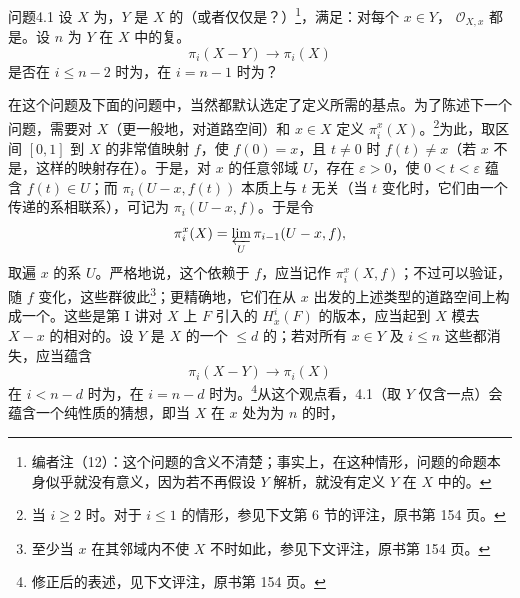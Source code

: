 \begin{SGAresult}{问题}{4.1}
设 $X$ 为，$Y$ 是 $X$ 的（或者仅仅是？）\footnote{编者注（12）：这个问题的含义不清楚；事实上，在这种情形，问题的命题本身似乎就没有意义，因为若不再假设 $Y$ 解析，就没有定义 $Y$ 在 $X$ 中的。}，满足：对每个 $x\in Y$， $\mathcal O_{X,x}$ 都是。设 $n$ 为 $Y$ 在 $X$ 中的复。
\[
\pi_i(X-Y)\longrightarrow\pi_i(X)
\]
是否在 $i\leq n-2$ 时为，在 $i=n-1$ 时为？
\end{SGAresult}
在这个问题及下面的问题中，当然都默认选定了定义所需的基点。为了陈述下一个问题，需要对 $X$（更一般地，对道路空间）和 $x\in X$ 定义 $\pi_i^x(X)$。\footnote{当 $i\geq2$ 时。对于 $i\leq1$ 的情形，参见下文第 6 节的评注，原书第 154 页。}为此，取区间 $[0,1]$ 到 $X$ 的非常值映射 $f$，使 $f(0)=x$，且 $t\ne0$ 时 $f(t)\ne x$（若 $x$ 不是，这样的映射存在）。于是，对 $x$ 的任意邻域 $U$，存在 $\varepsilon>0$，使 $0<t<\varepsilon$ 蕴含 $f(t)\in U$；而 $\pi_i(U-x,f(t))$ 本质上与 $t$ 无关（当 $t$ 变化时，它们由一个传递的系相联系），可记为 $\pi_i(U-x,f)$。于是令
\[
\pi_i^x(X)=\varprojlim_U\pi_{i-1}(U-x,f),
\]
取遍 $x$ 的系 $U$。严格地说，这个依赖于 $f$，应当记作 $\pi_i^x(X,f)$；不过可以验证，随 $f$ 变化，这些群彼此\footnote{至少当 $x$ 在其邻域内不使 $X$ 不时如此，参见下文评注，原书第 154 页。}；更精确地，它们在从 $x$ 出发的上述类型的道路空间上构成一个。这些是第 I 讲对 $X$ 上 $F$ 引入的 $H^i_x(F)$ 的版本，应当起到 $X$ 模去 $X-x$ 的相对的。设 $Y$ 是 $X$ 的一个 $\leq d$ 的；若对所有 $x\in Y$ 及 $i\leq n$ 这些都消失，应当蕴含
\[
\pi_i(X-Y)\longrightarrow\pi_i(X)
\]
在 $i<n-d$ 时为，在 $i=n-d$ 时为。\footnote{修正后的表述，见下文评注，原书第 154 页。}从这个观点看，4.1（取 $Y$ 仅含一点）会蕴含一个纯性质的猜想，即当 $X$ 在 $x$ 处为为 $n$ 的时，
